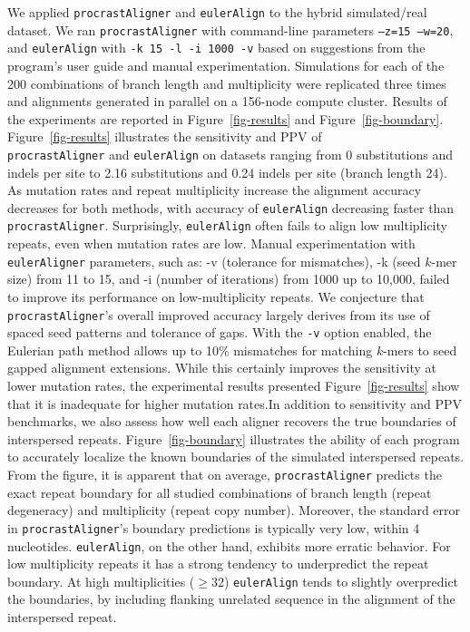 \documentclass{llncs}
\begin{document}
We applied \texttt{procrastAligner} and \texttt{eulerAlign} to the
hybrid simulated/real dataset.  We ran \texttt{procrastAligner}
with command-line parameters \texttt{--z=15 --w=20}, and
\texttt{eulerAlign} with \texttt{-k 15 -l -i 1000 -v} based on suggestions
from the program's user guide and manual experimentation.
Simulations for each of the 200 combinations of branch length and
multiplicity were replicated three times and alignments generated in
parallel on a 156-node compute cluster.  Results of the experiments
are reported in Figure~\ref{fig-results} and
Figure~\ref{fig-boundary}. Figure~\ref{fig-results} illustrates the
sensitivity and PPV of \\
\texttt{procrastAligner} and
\texttt{eulerAlign} on datasets ranging from 0 substitutions and
indels per site to 2.16 substitutions and 0.24 indels per site (branch length 24).  As
mutation rates and repeat multiplicity increase the alignment accuracy
decreases for both methods, with accuracy of \texttt{eulerAlign}
decreasing faster than \texttt{procrastAligner}.  Surprisingly, \texttt{eulerAlign}
often fails to align low multiplicity repeats, even when mutation rates are low.
Manual experimentation with \texttt{eulerAligner} parameters, such as: -v (tolerance for mismatches), -k (seed $k$-mer size) from 11 to 15, and -i (number of iterations) from 1000 up to 10,000, failed to improve its performance on low-multiplicity repeats.
We conjecture that \texttt{procrastAligner}'s overall improved accuracy largely derives
from its use of spaced seed patterns\cite{ref-procrast} and tolerance
of gaps. With the \texttt{-v} option enabled, the Eulerian path method allows up to 10\% mismatches for matching $k$-mers to seed gapped alignment extensions. While this certainly improves the sensitivity at lower mutation rates, the experimental results presented Figure~\ref{fig-results} show that it is inadequate for higher mutation rates.In addition to sensitivity and PPV benchmarks, we also assess how well
each aligner recovers the true boundaries of interspersed
repeats.  Figure~\ref{fig-boundary} illustrates the ability of each
program to accurately localize the known boundaries of the simulated interspersed
repeats. From the figure, it is apparent that on average, \texttt{procrastAligner} predicts
the exact repeat boundary for all studied combinations of branch length (repeat degeneracy)
and multiplicity (repeat copy number).  Moreover, the standard error in \texttt{procrastAligner}'s
boundary predictions is typically very low, within 4 nucleotides.  \texttt{eulerAlign}, on the other hand,
exhibits more erratic behavior.  For low multiplicity repeats it has a strong tendency to
underpredict the repeat boundary.  At high multiplicities ($\geq32$) \texttt{eulerAlign} tends to
slightly overpredict the boundaries, by including flanking unrelated sequence in the alignment of
the interspersed repeat.
\end{document}

